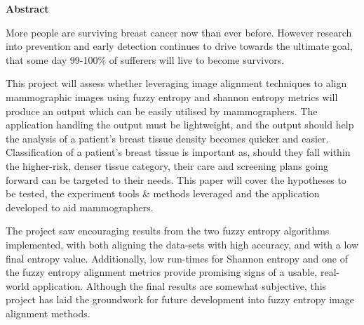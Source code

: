 \thispagestyle{empty}

\begin{center}
    {\LARGE\bf Abstract}
\end{center}

More people are surviving breast cancer now than ever before. However research into prevention and early detection continues to drive towards the ultimate goal, that some day 99-100\% of sufferers will live to become survivors.

This project will assess whether leveraging image alignment techniques to align mammographic images using fuzzy entropy and shannon entropy metrics will produce an output which can be easily utilised by mammographers. The application handling the output must be lightweight, and the output should help the analysis of a patient's breast tissue density becomes quicker and easier. Classification of a patient's breast tissue is important as, should they fall within the higher-risk, denser tissue category, their care and screening plans going forward can be targeted to their needs. This paper will cover the hypotheses to be tested, the experiment tools \& methods leveraged and the application developed to aid mammographers.

The project saw encouraging results from the two fuzzy entropy algorithms implemented, with both aligning the data-sets with high accuracy, and with a low final entropy value. Additionally, low run-times for Shannon entropy and one of the fuzzy entropy alignment metrics provide promising signs of a usable, real-world application. Although the final results are somewhat subjective, this project has laid the groundwork for future development into fuzzy entropy image alignment methods.
